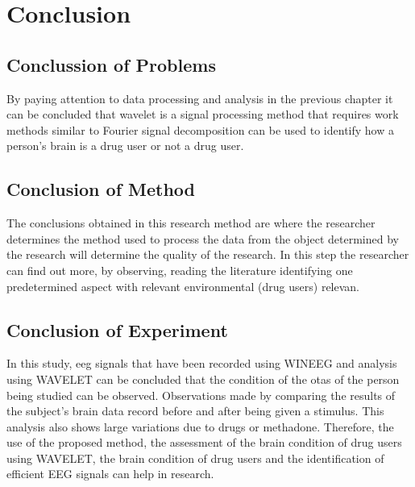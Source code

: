 \chapter{Conclusion}
\section{Conclussion of Problems}
\par
        By paying attention to data processing and analysis in the previous chapter it can be concluded that wavelet is a signal processing method that requires work methods similar to Fourier signal decomposition can be used to identify how a person's brain is a drug user or not a drug user. 
        
\section{Conclusion of Method}
\par
The conclusions obtained in this research method are where the researcher determines the method used to process the data from the object determined by the research will determine the quality of the research. In this step the researcher can find out more, by observing, reading the literature identifying one predetermined aspect with relevant environmental (drug users) relevan.

\section{Conclusion of Experiment}
\par
In this study, eeg signals that have been recorded using WINEEG and analysis using WAVELET can be concluded that the condition of the otas of the person being studied can be observed. Observations made by comparing the results of the subject's brain data record before and after being given a stimulus. This analysis also shows large variations due to drugs or methadone. Therefore, the use of the proposed method, the assessment of the brain condition of drug users using WAVELET, the brain condition of drug users and the identification of efficient EEG signals can help in research.